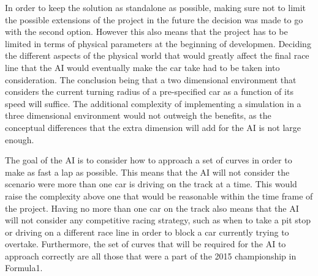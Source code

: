 In order to keep the solution as standalone as possible, making sure not to limit the possible extensions of the project in the future the decision was made to go with the second option. However this also means that the project has to be limited in terms of physical parameters at the beginning of developmen. Deciding the different aspects of the physical world that would greatly affect the final race line that the AI would eventually make the car take had to be taken into consideration. The conclusion being that a two dimensional environment that considers the current turning radius of a pre-specified car as a function of its speed will suffice. The additional complexity of implementing a simulation in a three dimensional environment would not outweigh the benefits, as the conceptual differences that the extra dimension will add for the AI is not large enough.

The goal of the AI is to consider how to approach a set of curves in order to make as fast a lap as possible. This means that the AI will not consider the scenario were more than one car is driving on the track at a time. This would raise the complexity above one that would be reasonable within the time frame of the project. Having no more than one car on the track also means that the AI will not consider any competitive racing strategy, such as when to take a pit stop or driving on a different race line in order to block a car currently trying to overtake. Furthermore, the set of curves that will be required for the AI to approach correctly are all those that were a part of the 2015 championship in Formula1.


